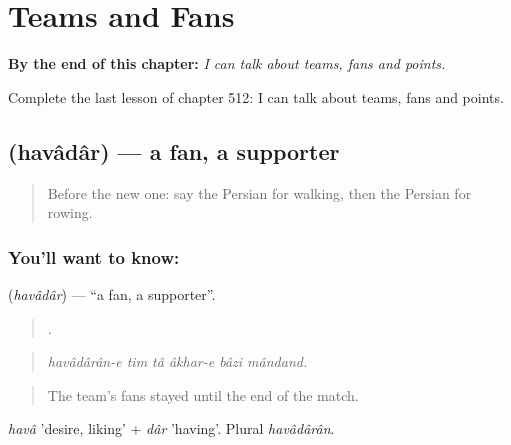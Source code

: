 
\chapter{Teams and Fans}
\label{ch:fa-teams-and-fans}

\begin{chapteropening}
\textbf{By the end of this chapter:} \emph{I can talk about teams, fans and points.}

Complete the last lesson of chapter 512: I can talk about teams, fans and points.
\end{chapteropening}

\section[\texorpdfstring{\fa{هوادار} (havâdâr)}{هوادار (havâdâr)}]{ (havâdâr) — a fan, a supporter}

\label{lesson:FA-C512-havadar}



\begin{quote}
Before the new one: say the Persian for walking, then the Persian for rowing.
\end{quote}

\subsection*{You'll want to know: }
\textbf{} (\emph{havâdâr}) — \textquotedblleft{}a fan, a supporter\textquotedblright{}.

\begin{quote}
     .
\end{quote}

\begin{quote}
\emph{havâdârân-e tim tâ âkhar-e bâzi mândand.}
\end{quote}

\begin{quote}
The team's fans stayed until the end of the match.
\end{quote}

\emph{havâ} 'desire, liking' + \emph{dâr} 'having'. Plural \emph{havâdârân}.

